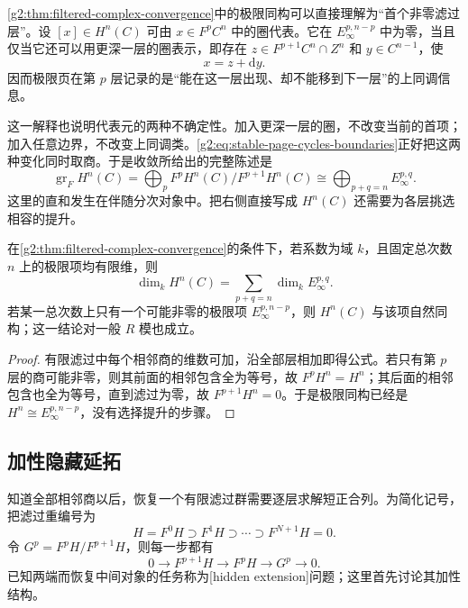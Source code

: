 \cref{g2:thm:filtered-complex-convergence}中的极限同构可以直接理解为“首个非零滤过层”。设 \([x]\in H^n(C)\) 可由 \(x\in F^pC^n\) 中的圈代表。它在 \(E_\infty^{p,n-p}\) 中为零，当且仅当它还可以用更深一层的圈表示，即存在 \(z\in F^{p+1}C^n\cap Z^n\) 和 \(y\in C^{n-1}\)，使
\[
	x=z+\mathrm dy.
\]
因而极限页在第 \(p\) 层记录的是“能在这一层出现、却不能移到下一层”的上同调信息。

\ProseParagraphBreak

这一解释也说明代表元的两种不确定性。加入更深一层的圈，不改变当前的首项；加入任意边界，不改变上同调类。\eqref{g2:eq:stable-page-cycles-boundaries}正好把这两种变化同时取商。于是收敛所给出的完整陈述是
\[
	\operatorname{gr}_F H^n(C)
	=\bigoplus_pF^pH^n(C)/F^{p+1}H^n(C)
	\cong\bigoplus_{p+q=n}E_\infty^{p,q}.
\]
这里的直和发生在伴随分次对象中。把右侧直接写成 \(H^n(C)\) 还需要为各层挑选相容的提升。

\begin{corollary}\label{g2:cor:spectral-sequence-dimension}
	在\cref{g2:thm:filtered-complex-convergence}的条件下，若系数为域 \(k\)，且固定总次数 \(n\) 上的极限项均有限维，则
	\[
		\dim_kH^n(C)=\sum_{p+q=n}\dim_kE_\infty^{p,q}.
	\]
	若某一总次数上只有一个可能非零的极限项 \(E_\infty^{p,n-p}\)，则 \(H^n(C)\) 与该项自然同构；这一结论对一般 \(R\) 模也成立。
\end{corollary}
\begin{proof}
	有限滤过中每个相邻商的维数可加，沿全部层相加即得公式。若只有第 \(p\) 层的商可能非零，则其前面的相邻包含全为等号，故 \(F^pH^n=H^n\)；其后面的相邻包含也全为等号，直到滤过为零，故 \(F^{p+1}H^n=0\)。于是极限同构已经是 \(H^n\cong E_\infty^{p,n-p}\)，没有选择提升的步骤。
\end{proof}

\subsection{加性隐藏延拓}
\label{g2:subsec:1004:04}

知道全部相邻商以后，恢复一个有限滤过群需要逐层求解短正合列。为简化记号，把滤过重编号为
\[
	H=F^0H\supset F^1H\supset\cdots\supset F^{N+1}H=0.
\]
令 \(G^p=F^pH/F^{p+1}H\)，则每一步都有
\begin{equation}\label{g2:eq:hidden-additive-extension}
	0\longrightarrow F^{p+1}H\longrightarrow F^pH\longrightarrow G^p\longrightarrow0.
\end{equation}
已知两端而恢复中间对象的任务称为[hidden extension]问题；这里首先讨论其加性结构。

